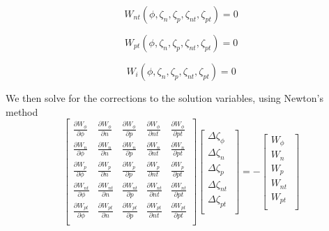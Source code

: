\documentclass[11pt]{article}
\begin{document}
\begin{equation}
W_{nt}(\phi,\zeta_{n},\zeta_{p},\zeta_{nt},\zeta_{pt})=0
\end{equation}

\begin{equation}
W_{pt}(\phi,\zeta_{n},\zeta_{p},\zeta_{nt},\zeta_{pt})=0
\end{equation}

\begin{equation}
W_{i}(\phi,\zeta_{n},\zeta_{p},\zeta_{nt},\zeta_{pt})=0
\end{equation}

We then solve for the corrections to the solution variables, using Newton's method
\begin{equation}
\begin{bmatrix}
\frac{\partial W_{\phi}}{\partial \phi} &
\frac{\partial W_{\phi}}{\partial n} &
\frac{\partial W_{\phi}}{\partial p} &
\frac{\partial W_{\phi}}{\partial nt} &
\frac{\partial W_{\phi}}{\partial pt}\\[0.3em]
\frac{\partial W_{n}}{\partial \phi} &
\frac{\partial W_{n}}{\partial n} &
\frac{\partial W_{n}}{\partial p} &
\frac{\partial W_{n}}{\partial nt} &
\frac{\partial W_{n}}{\partial pt}\\[0.3em]
\frac{\partial W_{p}}{\partial \phi} &
\frac{\partial W_{p}}{\partial n} &
\frac{\partial W_{p}}{\partial p} &
\frac{\partial W_{p}}{\partial nt} &
\frac{\partial W_{p}}{\partial pt}\\[0.3em]
\frac{\partial W_{nt}}{\partial \phi} &
\frac{\partial W_{nt}}{\partial n} &
\frac{\partial W_{nt}}{\partial p} &
\frac{\partial W_{nt}}{\partial nt} &
\frac{\partial W_{nt}}{\partial pt}\\[0.3em]
\frac{\partial W_{pt}}{\partial \phi} &
\frac{\partial W_{pt}}{\partial n} &
\frac{\partial W_{pt}}{\partial p} &
\frac{\partial W_{pt}}{\partial nt} &
\frac{\partial W_{pt}}{\partial pt}\\[0.3em]
\end{bmatrix}
\begin{bmatrix}
\Delta \zeta_\phi \\[0.3em]
\Delta \zeta_{n}\ \\[0.3em]
\Delta \zeta_{p}\ \\[0.3em]
\Delta \zeta_{nt}\ \\[0.3em]
\Delta \zeta_{pt}\ \\[0.3em]
\end{bmatrix}
=-
\begin{bmatrix}
W_\phi \\[0.3em]
W_{n}\ \\[0.3em]
W_{p}\ \\[0.3em]
W_{nt}\ \\[0.3em]
W_{pt}\ \\[0.3em]
\end{bmatrix}
\end{equation}
\end{document}
